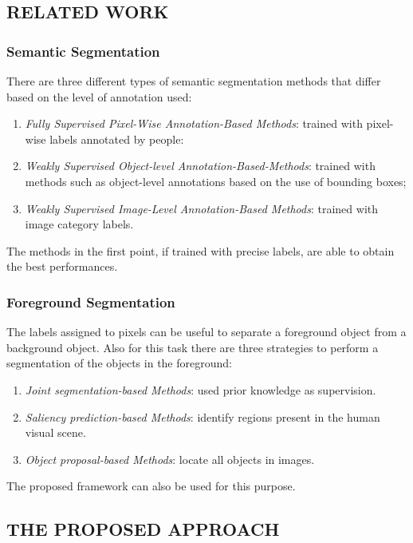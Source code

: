 \subsection{RELATED WORK}
\subsubsection{Semantic Segmentation}
There are three different types of semantic segmentation methods that differ 
based on the level of annotation used:
\begin{enumerate}
    \item \emph{Fully Supervised Pixel-Wise Annotation-Based Methods}: trained with 
    pixel-wise labels annotated by people:
    \item \emph{Weakly Supervised Object-level Annotation-Based-Methods}: trained with 
    methods such as object-level annotations based on the use of bounding 
    boxes;
    \item \emph{Weakly Supervised Image-Level Annotation-Based Methods}: trained 
    with image category labels.
\end{enumerate}
The methods in the first point, if trained with precise labels, are able to 
obtain the best performances.

\subsubsection{Foreground Segmentation}
The labels assigned to pixels can be useful to separate a foreground object 
from a background object. Also for this task there are three strategies to 
perform a segmentation of the objects in the foreground:
\begin{enumerate}
    \item \emph{Joint segmentation-based Methods}: used prior knowledge as supervision.
    \item \emph{Saliency prediction-based Methods}: identify regions present in the human 
    visual scene.
    \item \emph{Object proposal-based Methods}: locate all objects in images.
\end{enumerate}
The proposed framework can also be used for this purpose.

\subsection{THE PROPOSED APPROACH}
